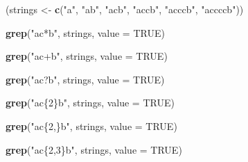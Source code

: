 \documentclass[]{book}
\newenvironment{Shaded}{\begin{snugshade}}{\end{snugshade}}
\newcommand{\DataTypeTok}[1]{\textcolor[rgb]{0.13,0.29,0.53}{#1}}
\newcommand{\KeywordTok}[1]{\textcolor[rgb]{0.13,0.29,0.53}{\textbf{#1}}}
\newcommand{\NormalTok}[1]{#1}
\newcommand{\OtherTok}[1]{\textcolor[rgb]{0.56,0.35,0.01}{#1}}
\newcommand{\StringTok}[1]{\textcolor[rgb]{0.31,0.60,0.02}{#1}}
\theoremstyle{definition}
\theoremstyle{definition}
\theoremstyle{definition}
\theoremstyle{remark}
\begin{document}
\begin{Shaded}
\begin{Highlighting}[]
\NormalTok{(strings <-}\StringTok{ }\KeywordTok{c}\NormalTok{(}\StringTok{"a"}\NormalTok{, }\StringTok{"ab"}\NormalTok{, }\StringTok{"acb"}\NormalTok{, }\StringTok{"accb"}\NormalTok{, }\StringTok{"acccb"}\NormalTok{, }\StringTok{"accccb"}\NormalTok{))}
\end{Highlighting}
\end{Shaded}

\begin{Shaded}
\begin{Highlighting}[]
\KeywordTok{grep}\NormalTok{(}\StringTok{"ac*b"}\NormalTok{, strings, }\DataTypeTok{value =} \OtherTok{TRUE}\NormalTok{)}
\end{Highlighting}
\end{Shaded}

\begin{Shaded}
\begin{Highlighting}[]
\KeywordTok{grep}\NormalTok{(}\StringTok{"ac+b"}\NormalTok{, strings, }\DataTypeTok{value =} \OtherTok{TRUE}\NormalTok{)}
\end{Highlighting}
\end{Shaded}

\begin{Shaded}
\begin{Highlighting}[]
\KeywordTok{grep}\NormalTok{(}\StringTok{"ac?b"}\NormalTok{, strings, }\DataTypeTok{value =} \OtherTok{TRUE}\NormalTok{)}
\end{Highlighting}
\end{Shaded}

\begin{Shaded}
\begin{Highlighting}[]
\KeywordTok{grep}\NormalTok{(}\StringTok{"ac\{2\}b"}\NormalTok{, strings, }\DataTypeTok{value =} \OtherTok{TRUE}\NormalTok{)}
\end{Highlighting}
\end{Shaded}

\begin{Shaded}
\begin{Highlighting}[]
\KeywordTok{grep}\NormalTok{(}\StringTok{"ac\{2,\}b"}\NormalTok{, strings, }\DataTypeTok{value =} \OtherTok{TRUE}\NormalTok{)}
\end{Highlighting}
\end{Shaded}

\begin{Shaded}
\begin{Highlighting}[]
\KeywordTok{grep}\NormalTok{(}\StringTok{"ac\{2,3\}b"}\NormalTok{, strings, }\DataTypeTok{value =} \OtherTok{TRUE}\NormalTok{)}
\end{Highlighting}
\end{Shaded}
\end{document}
